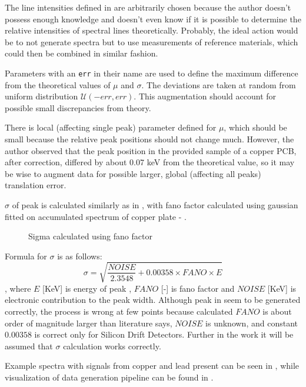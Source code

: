 The line intensities defined in  are arbitrarily chosen because the author doesn't possess enough knowledge and doesn't even know if it is possible to determine the relative intensities of spectral lines theoretically. 
Probably, the ideal action would be to not generate spectra but to use measurements of reference materials, which could then be combined in similar fashion.

Parameters with an \texttt{err} in their name are used to define the maximum difference from the theoretical values of $\mu$ and $\sigma$. 
The deviations are taken at random from uniform distribution $\mathcal{U}(-err, err)$.
This augmentation should account for possible small discrepancies from theory. 

There is local (affecting single peak) parameter defined for $\mu$, which should be small because the relative peak positions should not change much. 
However, the author observed that the peak position in the provided sample of a copper PCB, after correction, differed by about 0.07 keV from the theoretical value, so it may be wise to augment data for possible larger, global (affecting all peaks) translation error.

$\sigma$ of peak is calculated similarly as in \cite{Jones2022}, with fano factor calculated using gaussian fitted on accumulated spectrum of copper plate - .

\begin{figure}[H] 
  \centering     
   
  \caption{Sigma calculated using fano factor}
  \label{fig:fano-factor}
\end{figure}

Formula for $\sigma$ is as follows: \[\sigma = \sqrt{\frac{NOISE}{2.3548} + 0.00358 \times FANO \times E}\],
where $E$ [KeV] is energy of peak , $FANO$ [-] is fano factor and $NOISE$ [KeV] is electronic contribution to the peak width.
Although peak in  seem to be generated correctly, the process is wrong at few points because calculated $FANO$ is about order of magnitude larger than literature says, $NOISE$ is unknown, and constant $0.00358$ is correct only for Silicon Drift Detectors.
Further in the work it will be assumed that $\sigma$ calculation works correctly.

Example spectra with signals from copper and lead present can be seen in , while visualization of data generation pipeline can be found in .

